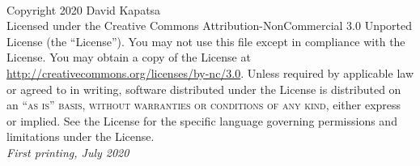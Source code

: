 \documentclass[11pt,fleqn]{book} %
\begin{document}

\begingroup
\thispagestyle{empty} %
\vfill
\endgroup


\newpage
~\vfill
\thispagestyle{empty}

\noindent Copyright 2020 David Kapatsa\\ %



\noindent Licensed under the Creative Commons Attribution-NonCommercial 3.0 Unported License (the ``License''). You may not use this file except in compliance with the License. You may obtain a copy of the License at \url{http://creativecommons.org/licenses/by-nc/3.0}. Unless required by applicable law or agreed to in writing, software distributed under the License is distributed on an \textsc{``as is'' basis, without warranties or conditions of any kind}, either express or implied. See the License for the specific language governing permissions and limitations under the License.\\ %

\noindent \textit{First printing, July 2020} %

\end{document}
